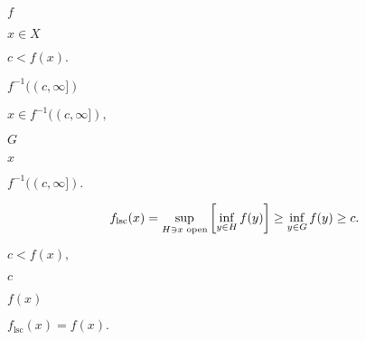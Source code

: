 \documentclass[10pt]{book}
\begin{document}
\begin{mdSnippets}
\begin{mdInlineSnippet}
$f$\end{mdInlineSnippet}%
\begin{mdInlineSnippet}[4202025ca33a0244467654fcec511b07]%
$x \in X$\end{mdInlineSnippet}%
\begin{mdInlineSnippet}[d3c94338406e158dfc775878383b1a9b]%
$c < f(x).$\end{mdInlineSnippet}%
\begin{mdInlineSnippet}[bd9a25206d9dd30b4167e1768fd7f67f]%
$f^{-1}((c, \infty])$\end{mdInlineSnippet}%
\begin{mdInlineSnippet}[d70d6003a14c06326b4596a29101a29f]%
$x \in f^{-1}((c, \infty]),$\end{mdInlineSnippet}%
\begin{mdInlineSnippet}[dfcf28d0734569a6a693bc8194de62bf]%
$G$\end{mdInlineSnippet}%
\begin{mdInlineSnippet}[9dd4e461268c8034f5c8564e155c67a6]%
$x$\end{mdInlineSnippet}%
\begin{mdInlineSnippet}[c5fbacb75fe2e0e55ab12279de6a1911]%
$f^{-1}((c, \infty]).$\end{mdInlineSnippet}%
\begin{mdDisplaySnippet}[9d8aaaba01f3f1f000818ae055bb6e07]%
\[%
f_\text{lsc}(x) = \sup_{H \ni x \text{ open}} \qty[\inf_{y \in H} f(y)]
\ge \inf_{y \in G} f(y) \ge c.
\]%
\end{mdDisplaySnippet}%
\begin{mdInlineSnippet}[0c32250defe8a068e32972d9575867fc]%
$c < f(x),$\end{mdInlineSnippet}%
\begin{mdInlineSnippet}[4a8a08f09d37b73795649038408b5f33]%
$c$\end{mdInlineSnippet}%
\begin{mdInlineSnippet}[50bbd36e1fd2333108437a2ca378be62]%
$f(x)$\end{mdInlineSnippet}%
\begin{mdInlineSnippet}[7514e18ff950accabb60c38a41bb79db]%
$f_\text{lsc}(x) = f(x).$\end{mdInlineSnippet}%

\end{mdSnippets}
\end{document}
